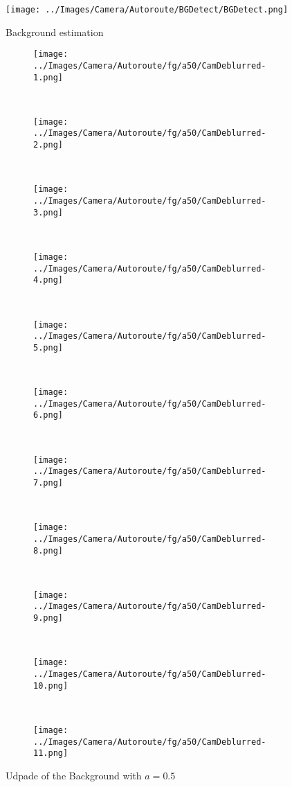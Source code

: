 \begin{figure}[h]
\centering
\texttt{[image: ../Images/Camera/Autoroute/BGDetect/BGDetect.png]}
\label{fig:AutBG}
\caption{Background estimation}
\end{figure} 


\begin{figure}[h]
\centering
\begin{subfigure}{0.20\textwidth}
\texttt{[image: ../Images/Camera/Autoroute/fg/a50/CamDeblurred-1.png]}
\caption{}
\label{fig:UAut1}
\end{subfigure}
~
\begin{subfigure}{0.20\textwidth}
\texttt{[image: ../Images/Camera/Autoroute/fg/a50/CamDeblurred-2.png]}
\caption{}
\label{fig:UAut2}
\end{subfigure}
~
\begin{subfigure}{0.20\textwidth}
\texttt{[image: ../Images/Camera/Autoroute/fg/a50/CamDeblurred-3.png]}
\caption{}
\label{fig:UAut3}
\end{subfigure}
~
\begin{subfigure}{0.20\textwidth}
\texttt{[image: ../Images/Camera/Autoroute/fg/a50/CamDeblurred-4.png]}
\caption{}
\label{fig:UAut4}
\end{subfigure}
~
\begin{subfigure}{0.20\textwidth}
\texttt{[image: ../Images/Camera/Autoroute/fg/a50/CamDeblurred-5.png]}
\caption{}
\label{fig:UAut5}
\end{subfigure}
~
\begin{subfigure}{0.20\textwidth}
\texttt{[image: ../Images/Camera/Autoroute/fg/a50/CamDeblurred-6.png]}
\caption{}
\label{fig:UAut6}
\end{subfigure}
~
\begin{subfigure}{0.20\textwidth}
\texttt{[image: ../Images/Camera/Autoroute/fg/a50/CamDeblurred-7.png]}
\caption{}
\label{fig:UAut7}
\end{subfigure}
~
\begin{subfigure}{0.20\textwidth}
\texttt{[image: ../Images/Camera/Autoroute/fg/a50/CamDeblurred-8.png]}
\caption{}
\label{fig:UAut8}
\end{subfigure}
~
\begin{subfigure}{0.20\textwidth}
\texttt{[image: ../Images/Camera/Autoroute/fg/a50/CamDeblurred-9.png]}
\caption{}
\label{fig:UAut9}
\end{subfigure}
~
\begin{subfigure}{0.20\textwidth}
\texttt{[image: ../Images/Camera/Autoroute/fg/a50/CamDeblurred-10.png]}
\caption{}
\label{fig:UAut10}
\end{subfigure}
~
\begin{subfigure}{0.20\textwidth}
\texttt{[image: ../Images/Camera/Autoroute/fg/a50/CamDeblurred-11.png]}
\caption{}
\label{fig:UAut11}
\end{subfigure}
\caption{Udpade of the Background with $a=0.5$}
\label{fig:Udpade}
\end{figure}

